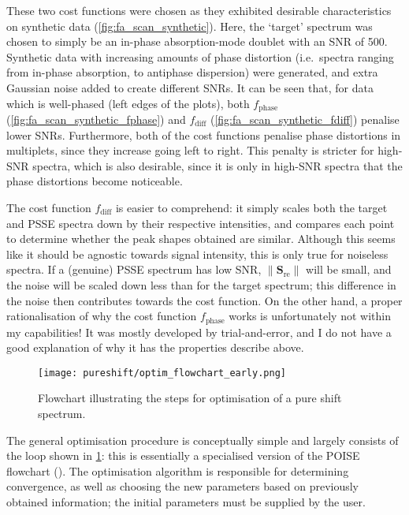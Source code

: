 These two cost functions were chosen as they exhibited desirable characteristics on synthetic data (\cref{fig:fa_scan_synthetic}).
Here, the `target' spectrum was chosen to simply be an in-phase absorption-mode doublet with an SNR of 500.
Synthetic data with increasing amounts of phase distortion (i.e.\ spectra ranging from in-phase absorption, to antiphase dispersion) were generated, and extra Gaussian noise added to create different SNRs.
It can be seen that, for data which is well-phased (left edges of the plots), both $f_\text{phase}$ (\cref{fig:fa_scan_synthetic_fphase}) and $f_\text{diff}$ (\cref{fig:fa_scan_synthetic_fdiff}) penalise lower SNRs.
Furthermore, both of the cost functions penalise phase distortions in multiplets, since they increase going left to right.
This penalty is stricter for high-SNR spectra, which is also desirable, since it is only in high-SNR spectra that the phase distortions become noticeable.

The cost function $f_\text{diff}$ is easier to comprehend: it simply scales both the target and PSSE spectra down by their respective intensities, and compares each point to determine whether the peak shapes obtained are similar.
Although this seems like it should be agnostic towards signal intensity, this is only true for noiseless spectra.
If a (genuine) PSSE spectrum has low SNR, $\lVert \symbf{S}_\text{re} \rVert$ will be small, and the noise will be scaled down less than for the target spectrum; this difference in the noise then contributes towards the cost function.
On the other hand, a proper rationalisation of why the cost function $f_\text{phase}$ works is unfortunately not within my capabilities!
It was mostly developed by trial-and-error, and I do not have a good explanation of why it has the properties describe above.


\begin{figure}[htbp]
    \centering
    \texttt{[image: pureshift/optim\_flowchart\_early.png]}
    \caption[Flowchart for pure shift optimisation process]{
        Flowchart illustrating the steps for optimisation of a pure shift spectrum.
    }
    \label{fig:optim_flowchart_early}
\end{figure}

The general optimisation procedure is conceptually simple and largely consists of the loop shown in \cref{fig:optim_flowchart_early}: this is essentially a specialised version of the POISE flowchart ().
The optimisation algorithm is responsible for determining convergence, as well as choosing the new parameters based on previously obtained information; the initial parameters must be supplied by the user.

